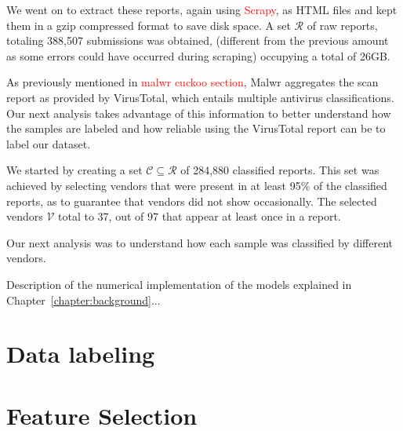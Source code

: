 We went on to extract these reports, again using \textcolor{red}{Scrapy}, as HTML files and kept them in a gzip compressed format to save disk space.
A set $\mathcal{R}$ of raw reports, totaling 388,507 submissions was obtained, (different from the
previous amount as some errors could have occurred during scraping) occupying a total of 26GB.

As previously mentioned in \textcolor{red}{malwr cuckoo section}, Malwr aggregates the scan report as provided by VirusTotal, which entails multiple antivirus classifications.
Our next analysis takes advantage of this information to better understand how the samples are labeled and how reliable using the VirusTotal report can be to label our dataset.

We started by creating a set $\mathcal{C}\subseteq\mathcal{R}$ of 284,880 classified reports.
This set was achieved by selecting vendors that were present in at least 95\% of the classified reports, as to guarantee that vendors did not show occasionally.
The selected vendors $\mathcal{V}$ total to 37, out of 97 that appear at least once in a report.


Our next analysis was to understand how each sample was classified by different vendors.




\newpage

Description of the numerical implementation of the models explained in Chapter~\ref{chapter:background}...

\section{Data labeling}
\label{section:data_labeling}

\section{Feature Selection}
\label{section:feature_selection}

